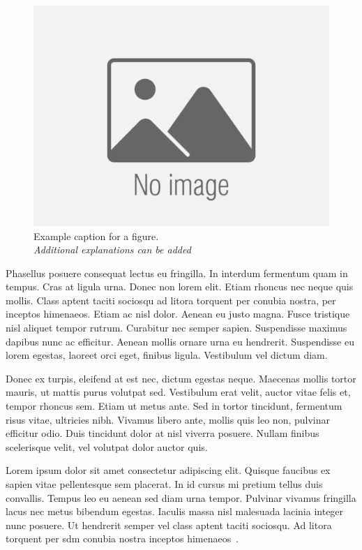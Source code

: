     \begin{figure}[hbtp!]
        \centering
        \includegraphics[width=0.5\linewidth]{Figures/image.png}
        \caption{Example caption for a figure.\\ \textit{Additional explanations can be added}}
        \label{fig:placeholder_example}
    \end{figure}

Phasellus posuere consequat lectus eu fringilla. In interdum fermentum quam in tempus. Cras at ligula urna. Donec non lorem elit. Etiam rhoncus nec neque quis mollis. Class aptent taciti sociosqu ad litora torquent per conubia nostra, per inceptos himenaeos. Etiam ac nisl dolor. Aenean eu justo magna. Fusce tristique nisl aliquet tempor rutrum. Curabitur nec semper sapien. Suspendisse maximus dapibus nunc ac efficitur. Aenean mollis ornare urna eu hendrerit. Suspendisse eu lorem egestas, laoreet orci eget, finibus ligula. Vestibulum vel dictum diam.

Donec ex turpis, eleifend at est nec, dictum egestas neque. Maecenas mollis tortor mauris, ut mattis purus volutpat sed. Vestibulum erat velit, auctor vitae felis et, tempor rhoncus sem. Etiam ut metus ante. Sed in tortor tincidunt, fermentum risus vitae, ultricies nibh. Vivamus libero ante, mollis quis leo non, pulvinar efficitur odio. Duis tincidunt dolor at nisl viverra posuere. Nullam finibus scelerisque velit, vel volutpat dolor auctor quis.

Lorem ipsum dolor sit amet consectetur adipiscing elit. Quisque faucibus ex sapien vitae pellentesque sem placerat. In id cursus mi pretium tellus duis convallis. Tempus leo eu aenean sed diam urna tempor. Pulvinar vivamus fringilla lacus nec metus bibendum egestas. Iaculis massa nisl malesuada lacinia integer nunc posuere. Ut hendrerit semper vel class aptent taciti sociosqu. Ad litora torquent per \gls{sdm} conubia nostra inceptos himenaeos~.

